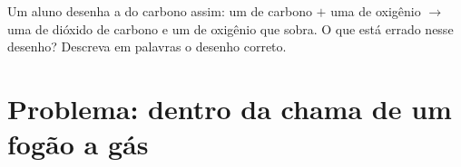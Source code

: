 \begin{exercise}[$\star\star\star$]\label{exo:g7:chemical-reactions:12}
Um aluno desenha a  do carbono assim: um  de carbono $+$ uma
 de oxigênio $\longrightarrow$ uma  de dióxido de
carbono e um  de oxigênio que sobra. O que está errado nesse
desenho? Descreva em palavras o desenho correto.
\end{exercise}

\section{Problema: dentro da chama de um fogão a gás}


